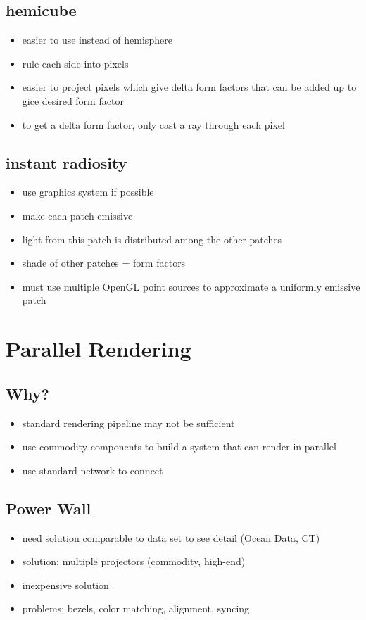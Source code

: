 \documentclass[11pt,a4paper]{article}
\begin{document}
\subsection{hemicube}
\begin{itemize}
	\item easier to use instead of hemisphere
	\item rule each side into pixels
	\item easier to project pixels which give delta form factors that can be added up to gice desired form factor
	\item to get a delta form factor, only cast a ray through each pixel
\end{itemize}
\subsection{instant radiosity}
\begin{itemize}
	\item use graphics system if possible
	\item make each patch emissive
	\item light from this patch is distributed among the other patches
	\item shade of other patches = form factors
	\item must use multiple OpenGL point sources to approximate a uniformly emissive patch
\end{itemize}

\section{Parallel Rendering}
\subsection{Why?}
\begin{itemize}
	\item standard rendering pipeline may not be sufficient
	\item use commodity components to build a system that can render in parallel
	\item use standard network to connect
\end{itemize}
\subsection{Power Wall}
\begin{itemize}
	\item need solution comparable to data set to see detail (Ocean Data, CT)
	\item solution: multiple projectors (commodity, high-end)
	\item inexpensive solution
	\item problems: bezels, color matching, alignment, syncing
\end{itemize}
\end{document}
